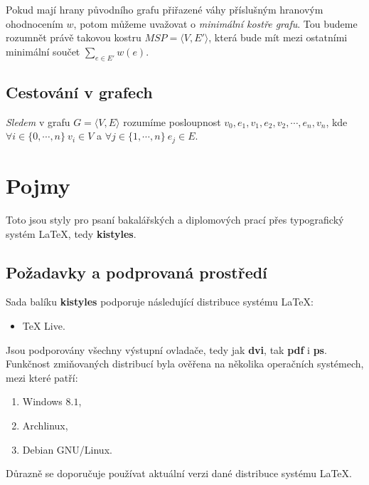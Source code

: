 \documentclass[
  biblatex,
  figures=false,
  glossaries,
  index
]{kidiplom}
\begin{document}
Pokud mají hrany původního grafu přiřazené váhy příslušným hranovým ohodnocením $w$, potom můžeme uvažovat o \textit{minimální kostře grafu}. Tou budeme rozumnět právě takovou kostru $MSP = \langle V, E' \rangle$, která bude mít mezi ostatními minimální součet  $\sum_{e \in E'} w(e)$.

\subsection{Cestování v grafech}

\begin{definition}
\textit{Sledem} v grafu $G=\langle V, E \rangle$ rozumíme posloupnost $v_0, e_1, v_1, e_2, v_2, \cdots, e_n, v_n$, kde $\forall i \in \{0,\cdots, n\} \ v_i \in V$ a $\forall j \in \{1, \cdots, n\} \ e_j \in E$.
\end{definition}



\pagebreak

\section{Pojmy}
Toto jsou styly pro psaní bakalářských a diplomových prací přes typografický systém \LaTeX{}, tedy \textbf{kistyles}.

\subsection{Požadavky a podprovaná prostředí}
Sada balíku \textbf{kistyles} podporuje následující distribuce systému \LaTeX{}:
\begin{itemize}
\item \TeX{} Live.
\end{itemize}



Jsou podporovány všechny výstupní ovladače, tedy jak \textbf{dvi}, tak \textbf{pdf} i \textbf{ps}. Funkčnost zmiňovaných distribucí byla ověřena na několika operačních systémech, mezi které patří:
\begin{enumerate}
\item Windows $8.1$,
\item Archlinux,
\item Debian GNU/Linux.
\end{enumerate}

Důrazně se doporučuje používat aktuální verzi dané distribuce systému \LaTeX{}.

\end{document}
